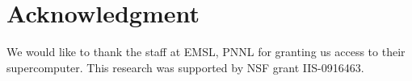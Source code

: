 \documentclass[10pt,journal,letterpaper,compsoc]{IEEEtran}
\begin{document}
\section*{Acknowledgment}
We would like to thank the staff at EMSL, PNNL for granting us access to their supercomputer. This research was supported by NSF grant IIS-0916463.





%
%
%

\end{document}
